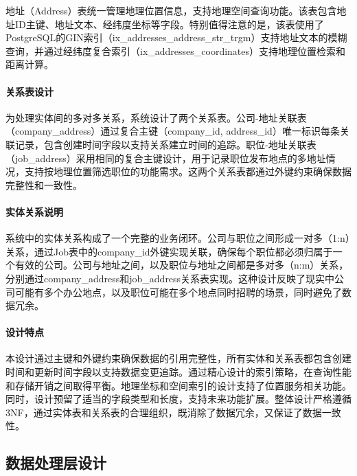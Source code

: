 地址（Address）表统一管理地理位置信息，支持地理空间查询功能。该表包含地址ID主键、地址文本、经纬度坐标等字段。特别值得注意的是，该表使用了PostgreSQL的GIN索引（ix\_addresses\_address\_str\_trgm）支持地址文本的模糊查询，并通过经纬度复合索引（ix\_addresses\_coordinates）支持地理位置检索和距离计算。

\paragraph{关系表设计}
为处理实体间的多对多关系，系统设计了两个关系表。公司-地址关联表（company\_address）通过复合主键（company\_id, address\_id）唯一标识每条关联记录，包含创建时间字段以支持关系建立时间的追踪。职位-地址关联表（job\_address）采用相同的复合主键设计，用于记录职位发布地点的多地址情况，支持按地理位置筛选职位的功能需求。这两个关系表都通过外键约束确保数据完整性和一致性。

\paragraph{实体关系说明}
系统中的实体关系构成了一个完整的业务闭环。公司与职位之间形成一对多（1:n）关系，通过Job表中的company\_id外键实现关联，确保每个职位都必须归属于一个有效的公司。公司与地址之间，以及职位与地址之间都是多对多（n:m）关系，分别通过company\_address和job\_address关系表实现。这种设计反映了现实中公司可能有多个办公地点，以及职位可能在多个地点同时招聘的场景，同时避免了数据冗余。

\paragraph{设计特点}
本设计通过主键和外键约束确保数据的引用完整性，所有实体和关系表都包含创建时间和更新时间字段以支持数据变更追踪。通过精心设计的索引策略，在查询性能和存储开销之间取得平衡。地理坐标和空间索引的设计支持了位置服务相关功能。同时，设计预留了适当的字段类型和长度，支持未来功能扩展。整体设计严格遵循3NF，通过实体表和关系表的合理组织，既消除了数据冗余，又保证了数据一致性。




\subsection{数据处理层设计}

